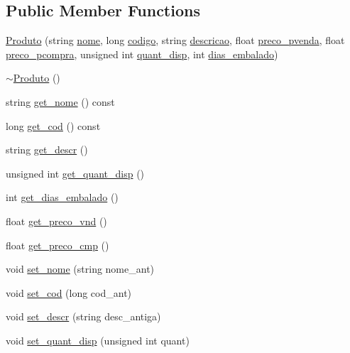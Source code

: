 \subsection*{Public Member Functions}
\begin{DoxyCompactItemize}
\item 
\hyperlink{class_produto_a178958f64bd003ce96dac2dea9983da2}{Produto} (string \hyperlink{class_produto_a68b0af895e00da960bea4fb9d22908a4}{nome}, long \hyperlink{class_produto_ae550723b388b42aa8d64ae25da28a989}{codigo}, string \hyperlink{class_produto_a23d49580a8e69e8ad100f1e903951df0}{descricao}, float \hyperlink{class_produto_aafe61b6a241575ca22bfd5ef6880eacc}{preco\_\-pvenda}, float \hyperlink{class_produto_a90ee7ed615f3d9e0b2f0972608c00a87}{preco\_\-pcompra}, unsigned int \hyperlink{class_produto_a4587e7d30d4fc36691e1d13d5b2ef6a1}{quant\_\-disp}, int \hyperlink{class_produto_ad41c279a89d62234c5be52dc66e43de7}{dias\_\-embalado})
\item 
\hyperlink{class_produto_a84a8b28176b743e8c74bfd89aee9a9b2}{$\sim$Produto} ()
\item 
string \hyperlink{class_produto_ad7e4344bd85327e41fe02930f250a0ee}{get\_\-nome} () const 
\item 
long \hyperlink{class_produto_a4ea4533bf9ed78c20496d3bac479ff7b}{get\_\-cod} () const 
\item 
string \hyperlink{class_produto_a87bc3792489b1466a9ef01d8824ce83a}{get\_\-descr} ()
\item 
unsigned int \hyperlink{class_produto_a625c3520f137c271df42a2b2a68df00e}{get\_\-quant\_\-disp} ()
\item 
int \hyperlink{class_produto_a01af89be4bc54cf909a34e0f48e86e2e}{get\_\-dias\_\-embalado} ()
\item 
float \hyperlink{class_produto_aad880393f0257e3133cd9947e15afb33}{get\_\-preco\_\-vnd} ()
\item 
float \hyperlink{class_produto_a750c3d6d0533b961ab4e4e8a13bb74e8}{get\_\-preco\_\-cmp} ()
\item 
void \hyperlink{class_produto_a6d6fc85fbd9327b3f4e86f9f85d00af7}{set\_\-nome} (string nome\_\-ant)
\item 
void \hyperlink{class_produto_a801c55c493277e8743cfc0a61747fbc3}{set\_\-cod} (long cod\_\-ant)
\item 
void \hyperlink{class_produto_a91fdd9ec75a2d677f8ec021edc2ced5b}{set\_\-descr} (string desc\_\-antiga)
\item 
void \hyperlink{class_produto_ae070d8ebdc6ee81ca344beeb8bef41b9}{set\_\-quant\_\-disp} (unsigned int quant)

\end{DoxyCompactItemize}
